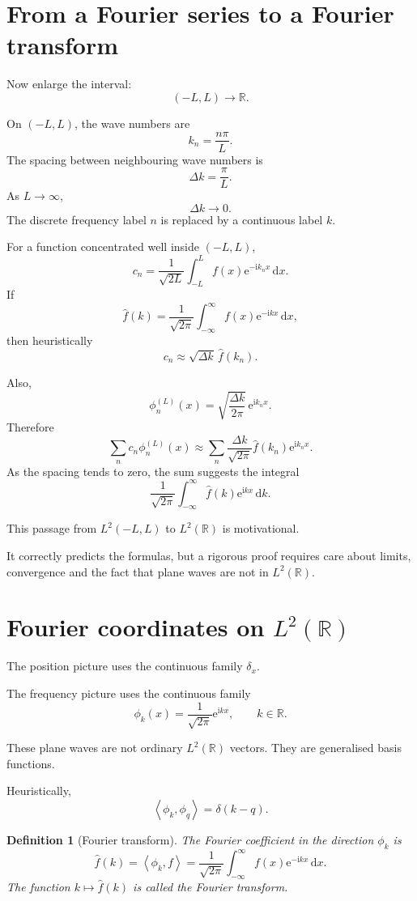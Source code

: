 \documentclass[11pt,a5paper,oneside,openany]{scrreprt}
\theoremstyle{notes}
\theoremstyle{definitions}
\newtheorem{definition}[theorem]{Definition}
\newcommand{\R}{\mathbb{R}}
\newcommand{\ip}[2]{\left\langle #1,#2\right\rangle}
\newcommand{\dd}{\,\mathrm{d}}
\newcommand{\e}{\mathrm{e}}
\begin{document}
\section{From a Fourier series to a Fourier transform}

Now enlarge the interval:
\[
 (-L,L)\longrightarrow\R.
\]

On $(-L,L)$, the wave numbers are
\[
 k_n=\frac{n\pi}{L}.
\]
The spacing between neighbouring wave numbers is
\[
 \Delta k=\frac{\pi}{L}.
\]
As $L\to\infty$,
\[
 \Delta k\to0.
\]
The discrete frequency label $n$ is replaced by a continuous label $k$.

For a function concentrated well inside $(-L,L)$,
\[
 c_n
 =\frac1{\sqrt{2L}}\int_{-L}^{L}
 f(x)\e^{-\mathrm i k_nx}\dd x.
\]
If
\[
 \widehat f(k)
 =\frac1{\sqrt{2\pi}}\int_{-\infty}^{\infty}
 f(x)\e^{-\mathrm i kx}\dd x,
\]
then heuristically
\[
 c_n\approx\sqrt{\Delta k}\,\widehat f(k_n).
\]

Also,
\[
 \phi_n^{(L)}(x)
 =\sqrt{\frac{\Delta k}{2\pi}}\,
 \e^{\mathrm i k_nx}.
\]
Therefore
\[
 \sum_n c_n\phi_n^{(L)}(x)
 \approx
 \sum_n
 \frac{\Delta k}{\sqrt{2\pi}}
 \widehat f(k_n)\e^{\mathrm i k_nx}.
\]
As the spacing tends to zero, the sum suggests the integral
\[
 \frac1{\sqrt{2\pi}}\int_{-\infty}^{\infty}
 \widehat f(k)\e^{\mathrm i kx}\dd k.
\]

\begin{caution}
This passage from $L^2(-L,L)$ to $L^2(\R)$ is motivational.

It correctly predicts the formulas, but a rigorous proof requires care
about limits, convergence and the fact that plane waves are not in
$L^2(\R)$.
\end{caution}

\section{Fourier coordinates on $L^2(\R)$}

The position picture uses the continuous family $\delta_x$.

The frequency picture uses the continuous family
\[
 \phi_k(x)=\frac1{\sqrt{2\pi}}\e^{\mathrm i kx},
 \qquad k\in\R.
\]

These plane waves are not ordinary $L^2(\R)$ vectors.  They are generalised
basis functions.

Heuristically,
\[
 \ip{\phi_k}{\phi_q}=\delta(k-q).
\]

\begin{definition}[Fourier transform]
The Fourier coefficient in the direction $\phi_k$ is
\[
 \boxed{
 \widehat f(k)
 =\ip{\phi_k}{f}
 =\frac1{\sqrt{2\pi}}\int_{-\infty}^{\infty}
 f(x)\e^{-\mathrm i kx}\dd x.}
\]
The function $k\mapsto\widehat f(k)$ is called the Fourier transform.
\end{definition}
\end{document}
